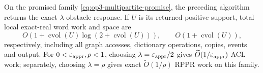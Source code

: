 \begin{theorem}
\label{thm:op3-local-multipartite}
On the promised family \cref{eq:op3-multipartite-promise}, the preceding
algorithm returns the exact $\lambda$-obstacle response. If $U$ is its
returned positive support, total local exact-real word work and space are
\begin{equation}
 O\!\left(1+\operatorname{cvol}(U)
                    \log(2+\operatorname{cvol}(U))\right),
 \qquad O(1+\operatorname{cvol}(U)),
 \label{eq:op3-multipartite-local-work}
\end{equation}
respectively, including all graph accesses, dictionary operations, copies,
events and output. For $0<\varepsilon_{\mathrm{appr}},\rho<1$, choosing
$\lambda=\varepsilon_{\mathrm{appr}}/2$ gives $\widetilde O(1/\varepsilon_{\mathrm{appr}})$ ACL work;
separately, choosing $\lambda=\rho$ gives exact
$\widetilde O(1/\rho)$ RPPR work on this family.
\end{theorem}
